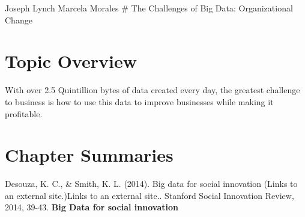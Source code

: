 \documentclass[]{book}
\theoremstyle{definition}
\theoremstyle{definition}
\theoremstyle{definition}
\theoremstyle{remark}
\begin{document}
Joseph Lynch Marcela Morales \# The Challenges of Big Data:
Organizational Change

\hypertarget{topic-overview-2}{%
\section{Topic Overview}\label{topic-overview-2}}

With over 2.5 Quintillion bytes of data created every day, the greatest
challenge to business is how to use this data to improve businesses
while making it profitable.

\hypertarget{chapter-summaries-2}{%
\section{Chapter Summaries}\label{chapter-summaries-2}}

Desouza, K. C., \& Smith, K. L. (2014). Big data for social innovation
(Links to an external site.)Links to an external site.. Stanford Social
Innovation Review, 2014, 39-43. \textbf{Big Data for social innovation}
\end{document}
